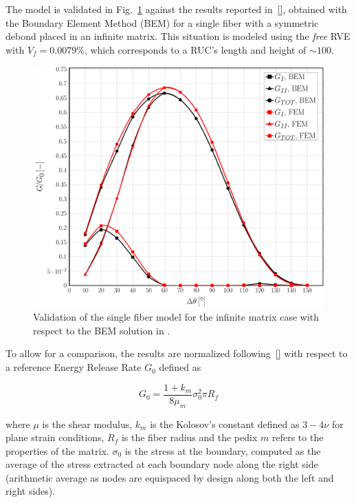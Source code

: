 \documentclass[review]{elsarticle}
\begin{document}
The model is validated in Fig.~\ref{fig:validation} against the results reported in~\ref{}, obtained with the Boundary Element Method (BEM) for a single fiber with a symmetric debond placed in an infinite matrix. This situation is modeled using the \textit{free} RVE with $V_{f}=0.0079\%$, which corresponds to a RUC's length and height of $\sim 100$.

\begin{figure}[!h]
\centering
\includegraphics[width=\textwidth]{validation-VCCT.pdf}
\caption{Validation of the single fiber model for the infinite matrix case with respect to the BEM solution in \cite{}.}\label{fig:validation}
\end{figure}

To allow for a comparison, the results are normalized following~\ref{} with respect to a reference Energy Release Rate $G_{0}$ defined as

\begin{equation}
G_{0}=\frac{1+k_{m}}{8\mu_{m}}\sigma_{0}^{2}\pi R_{f}
\end{equation}

where $\mu$ is the shear modulus, $k_{m}$ is the Kolosov's constant defined as $3-4\nu$ for plane strain conditions, $R_{f}$ is the fiber radius and the pedix $m$ refers to the properties of the matrix. $\sigma_{0}$ is the stress at the boundary, computed as the average of the stress extracted at each boundary node along the right side (arithmetic average as nodes are equispaced by design along both the left and right sides).
\end{document}
